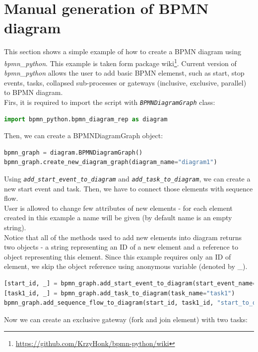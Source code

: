 \section{Manual generation of BPMN diagram}
This section shows a simple example of how to create a BPMN diagram using \emph{bpmn\_python}. This example is taken form package wiki\footnote{\url{https://github.com/KrzyHonk/bpmn-python/wiki}}. Current version of \emph{bpmn\_python} allows the user to add basic BPMN elemenst, such as start, stop events, tasks, collapsed sub-processes or gateways (inclusive, exclusive, parallel) to BPMN diagram.\\
Firs, it is required to import the script with \texttt{\emph{BPMNDiagramGraph}} class:
\begin{lstlisting}[language=python]
import bpmn_python.bpmn_diagram_rep as diagram
\end{lstlisting}
Then, we can create a BPMNDiagramGraph object:
\begin{lstlisting}[language=python]
bpmn_graph = diagram.BPMNDiagramGraph()
bpmn_graph.create_new_diagram_graph(diagram_name="diagram1")
\end{lstlisting}
Using \texttt{\emph{add\_start\_event\_to\_diagram}} and \texttt{\emph{add\_task\_to\_diagram}}, we can create a new start event and task. Then, we have to connect those elements with sequence flow.\\
User is allowed to change few attributes of new elements - for each element created in this example a name will be given (by default name is an empty string).\\
Notice that all of the methods used to add new elements into diagram returns two objects - a string representing an ID of a new element and a reference to object representing this element. Since this example requires only an ID of element, we skip the object reference using anonymous variable (denoted by \_).
\begin{lstlisting}[language=python]
[start_id, _] = bpmn_graph.add_start_event_to_diagram(start_event_name="start_event")
[task1_id, _] = bpmn_graph.add_task_to_diagram(task_name="task1")
bpmn_graph.add_sequence_flow_to_diagram(start_id, task1_id, "start_to_one")
\end{lstlisting}
Now we can create an exclusive gateway (fork and join element) with two tasks:
